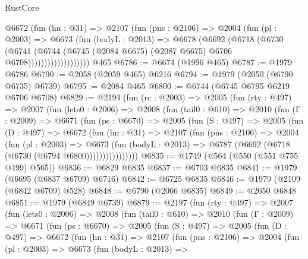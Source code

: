 \begin{lexlean}{RustCore}
\begin{coremodule}
                    @6672
                      (fun (hn : @31) =>
                      @2107
                        (fun (pns : @2106) =>
                        @2004
                          (fun (pl : @2003) =>
                          @6673
                            (fun (bodyL : @2013) =>
                            @6678
                              (@6692
                                (@6718
                                  (@6730
                                    (@6741
                                      (@6744
                                        (@6745
                                          (@2084 @6675)
                                          (@2087 @6675)
                                          @6706
                                          @6708)))))))))))))))))))
    @465
@6786 := @6674 (@1996 @465)
@6787 := @1979 @6786
@6790 := @2058 (@2059 @465) @6216
@6794 := @1979 (@2050 (@6790 @6735) @6739)
@6795 := @2084 @465
@6800 := @6744 (@6745 @6795 @6219 @6706 @6708)
@6829 := @2194
    (fun (rc : @2003) =>
    @2005
      (fun (rty : @497) =>
      @2007
        (fun (lets0 : @2006) =>
        @2008
          (fun (tail0 : @610) =>
          @2010
            (fun (Γ : @2009) =>
            @6671
              (fun (ps : @6670) =>
              @2005
                (fun (S : @497) =>
                @2005
                  (fun (D : @497) =>
                  @6672
                    (fun (hn : @31) =>
                    @2107
                      (fun (pns : @2106) =>
                      @2004
                        (fun (pl : @2003) =>
                        @6673
                          (fun (bodyL : @2013) =>
                          @6787 (@6692 (@6718 (@6730 (@6794 @6800))))))))))))))))
@6835 := @1749 (@564 (@550 (@551 @755 @499) @565))
@6836 := @6829 @6835
@6837 := @6703 @6835
@6841 := @1979 (@6695 (@6837 @6709) @6716)
@6842 := @6725 @6835
@6846 := @1979 (@2109 (@6842 @6709) @528)
@6848 := @6790 (@2066 @6835)
@6849 := @2050 @6848
@6851 := @1979 (@6849 @6739)
@6879 := @2197
    (fun (rty : @497) =>
    @2007
      (fun (lets0 : @2006) =>
      @2008
        (fun (tail0 : @610) =>
        @2010
          (fun (Γ : @2009) =>
          @6671
            (fun (ps : @6670) =>
            @2005
              (fun (S : @497) =>
              @2005
                (fun (D : @497) =>
                @6672
                  (fun (hn : @31) =>
                  @2107
                    (fun (pns : @2106) =>
                    @2004
                      (fun (pl : @2003) =>
                      @6673
                        (fun (bodyL : @2013) =>

\end{coremodule}
\end{lexlean}
